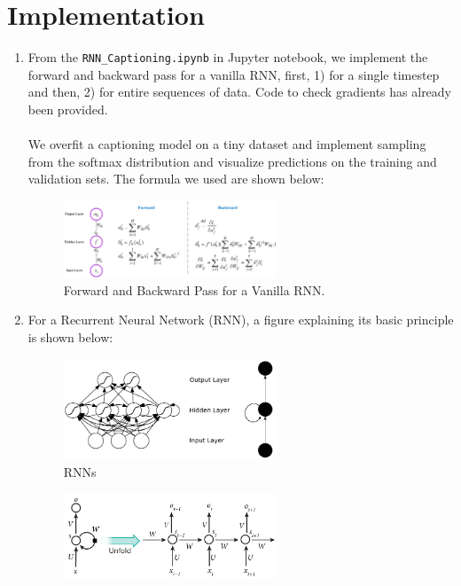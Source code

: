 \documentclass[english]{article}
\begin{document}
\section{Implementation}
\begin{enumerate}
\item From the \texttt{RNN\_Captioning.ipynb} in Jupyter notebook, we implement the forward and backward pass for a vanilla RNN, first, 1) for a single timestep and then, 2) for entire sequences of data. Code to check gradients has already been provided. \\\\We overfit a captioning model on a tiny dataset and implement sampling from the softmax distribution and visualize predictions on the training and validation sets. The formula we used are shown below:
\begin{figure}[H]
          \centering
          \includegraphics[width=0.6\textwidth]{Picture7.png}
          \caption{Forward and Backward Pass for a Vanilla RNN.}
\end{figure}
\item For a Recurrent Neural Network (RNN), a figure explaining its basic principle is shown below:
\begin{figure}[H]
          \centering
          \includegraphics[width=0.6\textwidth]{Picture6.png}
          \caption{RNNs}
\end{figure}
\begin{figure}[H]
          \centering
          \includegraphics[width=0.6\textwidth]{Picture5.png}

\end{figure}
\end{enumerate}
\end{document}
